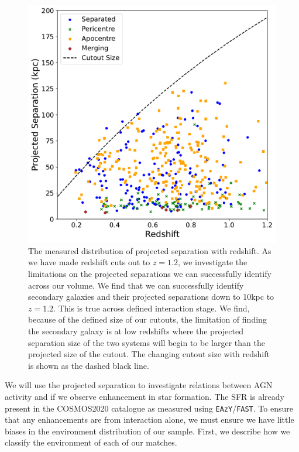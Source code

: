 \begin{figure}
\centering
\includegraphics[width=\textwidth]{Chapter3/figures/redshift-proj-sep-diagnostic.pdf}
\caption[The measured distribution of projected separation with redshift.]{The measured distribution of projected separation with redshift. As we have made redshift cuts out to $z = 1.2$, we investigate the limitations on the projected separations we can successfully identify across our volume. We find that we can successfully identify secondary galaxies and their projected separations down to 10kpc to $z=1.2$. This is true across defined interaction stage. We find, because of the defined size of our cutouts, the limitation of finding the secondary galaxy is at low redshifts where the projected separation size of the two systems will begin to be larger than the projected size of the cutout. The changing cutout size with redshift is shown as the dashed black line.}
\label{fig:proj-seps-limits}
\end{figure}

We will use the projected separation to investigate relations between AGN activity and if we observe enhancement in star formation. The SFR is already present in the COSMOS2020 catalogue as measured using \texttt{EAzY}/\texttt{FAST}. To ensure that any enhancements are from interaction alone, we must ensure we have little biases in the environment distribution of our sample. First, we describe how we classify the environment of each of our matches.

